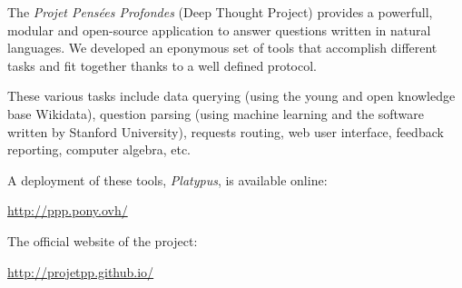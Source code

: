 The \emph{Projet Pensées Profondes} (Deep Thought Project) provides a powerfull,
modular and open-source application to answer questions written in natural languages.
We developed an eponymous set of tools that accomplish different tasks and fit
together thanks to a well defined protocol.

These various tasks include data querying (using the young and open
knowledge base Wikidata), question parsing (using machine learning and the
\CoreNLP software written by Stanford University),
requests routing, web user interface, feedback reporting, computer algebra, etc.

A deployment of these tools, \emph{Platypus}, is available online:

\begin{center}
    \url{http://ppp.pony.ovh/}
\end{center}

The official website of the project:

\begin{center}
    \url{http://projetpp.github.io/}
\end{center}
